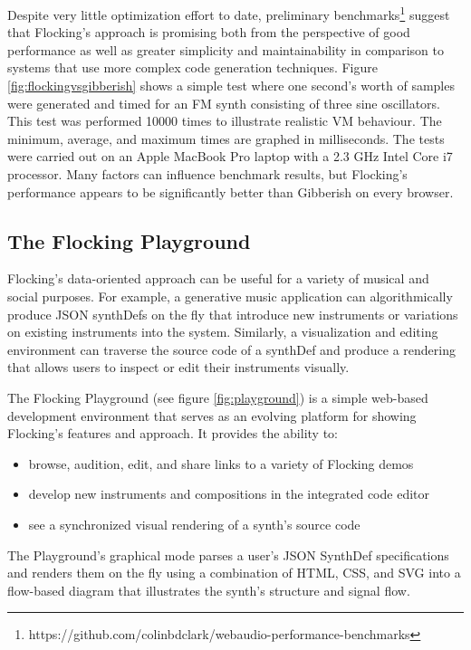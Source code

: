 \documentclass{article}
\begin{document}
Despite very little optimization effort to date, preliminary benchmarks\footnote{https://github.com/colinbdclark/webaudio-performance-benchmarks} suggest that Flocking's approach is promising both from the perspective of good performance as well as greater simplicity and maintainability in comparison to systems that use more complex code generation techniques. Figure \ref{fig:flockingvsgibberish} shows a simple test where one second's worth of samples were generated and timed for an FM synth consisting of three sine oscillators. This test was performed 10000 times to illustrate realistic VM behaviour. The minimum, average, and maximum times are graphed in milliseconds. The tests were carried out on an Apple MacBook Pro laptop with a 2.3 GHz Intel Core i7 processor. Many factors can influence benchmark results, but Flocking's performance appears to be significantly better than Gibberish on every browser.

\subsection{The Flocking Playground}

Flocking's data-oriented approach can be useful for a variety of musical and social purposes. For example, a generative music application can algorithmically produce JSON synthDefs on the fly that introduce new instruments or variations on existing instruments into the system. Similarly, a visualization and editing environment can traverse the source code of a synthDef and produce a rendering that allows users to inspect or edit their instruments visually.

The Flocking Playground (see figure \ref{fig:playground}) is a simple web-based development environment that serves as an evolving platform for showing Flocking's features and approach. It provides the ability to:

\begin{itemize}
\item browse, audition, edit, and share links to a variety of Flocking demos
\item develop new instruments and compositions in the integrated code editor
\item see a synchronized visual rendering of a synth's source code
\end{itemize}

The Playground's graphical mode parses a user's JSON SynthDef specifications and renders them on the fly using a combination of HTML, CSS, and SVG into a flow-based diagram that illustrates the synth's structure and signal flow.
\end{document}
